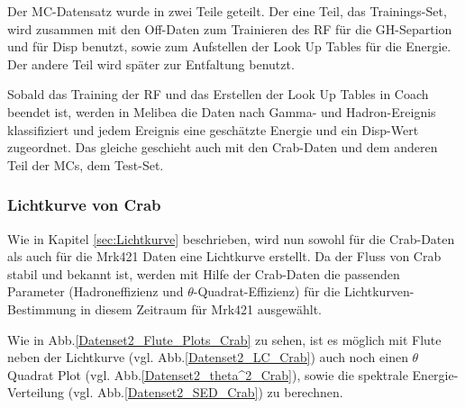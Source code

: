 Der MC-Datensatz wurde in zwei Teile geteilt.
Der eine Teil, das Trainings-Set, wird zusammen mit den Off-Daten zum Trainieren des RF für die GH-Separtion und für Disp benutzt, sowie zum Aufstellen der Look Up Tables für die Energie.
Der andere Teil wird später zur Entfaltung benutzt.

Sobald das Training der RF und das Erstellen der Look Up Tables in Coach beendet ist, werden in Melibea die Daten nach Gamma- und Hadron-Ereignis klassifiziert und jedem Ereignis eine geschätzte Energie und ein Disp-Wert zugeordnet.
Das gleiche geschieht auch mit den Crab-Daten und dem anderen Teil der MCs, dem Test-Set.


\subsubsection{Lichtkurve von Crab}
Wie in Kapitel \ref{sec:Lichtkurve} beschrieben, wird nun sowohl für die Crab-Daten als auch für die Mrk421 Daten eine Lichtkurve erstellt.
Da der Fluss von Crab stabil und bekannt ist, werden mit Hilfe der Crab-Daten die passenden Parameter (Hadroneffizienz und $\theta$-Quadrat-Effizienz) für die Lichtkurven-Bestimmung in diesem Zeitraum für Mrk421 ausgewählt.

Wie in Abb.\ref{Datenset2_Flute_Plots_Crab} zu sehen, ist es möglich mit Flute neben der Lichtkurve (vgl. Abb.\ref{Datenset2_LC_Crab}) auch noch einen $\theta$ Quadrat Plot (vgl. Abb.\ref{Datenset2_theta^2_Crab}), sowie die spektrale Energie-Verteilung (vgl. Abb.\ref{Datenset2_SED_Crab}) zu berechnen.

